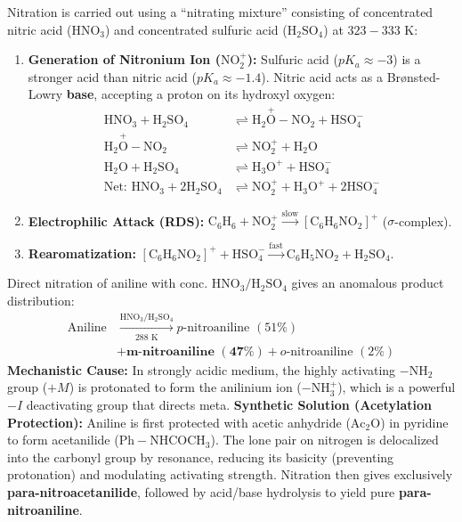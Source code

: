 \documentclass[10pt,twoside,openright]{book}
\begin{document}
\begin{conceptbox}
Nitration is carried out using a ``nitrating mixture'' consisting of concentrated nitric acid ($\mathrm{HNO_3}$) and concentrated sulfuric acid ($\mathrm{H_2SO_4}$) at $323-333\text{ K}$:
\begin{enumerate}[leftmargin=*]
  \item \textbf{Generation of Nitronium Ion ($\mathrm{NO_2^+}$):} Sulfuric acid ($pK_a \approx -3$) is a stronger acid than nitric acid ($pK_a \approx -1.4$). Nitric acid acts as a Br{\o}nsted-Lowry \textbf{base}, accepting a proton on its hydroxyl oxygen:
  \begin{align}
    \mathrm{HNO_3} + \mathrm{H_2SO_4} &\rightleftharpoons \mathrm{H_2\overset{+}{O}-NO_2} + \mathrm{HSO_4^-} \\
    \mathrm{H_2\overset{+}{O}-NO_2} &\rightleftharpoons \mathrm{NO_2^+} + \mathrm{H_2O} \\
    \mathrm{H_2O} + \mathrm{H_2SO_4} &\rightleftharpoons \mathrm{H_3O^+} + \mathrm{HSO_4^-} \\
    \text{Net: } \mathrm{HNO_3} + 2\mathrm{H_2SO_4} &\rightleftharpoons \mathrm{NO_2^+} + \mathrm{H_3O^+} + 2\mathrm{HSO_4^-}
  \end{align}
  \item \textbf{Electrophilic Attack (RDS):} $\mathrm{C_6H_6} + \mathrm{NO_2^+} \xrightarrow{\text{slow}} [\mathrm{C_6H_6NO_2}]^+$ ($\sigma$-complex).
  \item \textbf{Rearomatization:} $[\mathrm{C_6H_6NO_2}]^+ + \mathrm{HSO_4^-} \xrightarrow{\text{fast}} \mathrm{C_6H_5NO_2} + \mathrm{H_2SO_4}$.
\end{enumerate}
\end{conceptbox}

\begin{ncertbox}
Direct nitration of aniline with conc. $\mathrm{HNO_3} / \mathrm{H_2SO_4}$ gives an anomalous product distribution:
\begin{align}
  \text{Aniline} &\xrightarrow[\text{288 K}]{\mathrm{HNO_3/H_2SO_4}} p\text{-nitroaniline } (51\%) \\
  &+ \mathbf{m}\textbf{-nitroaniline } (\mathbf{47\%}) + o\text{-nitroaniline } (2\%)
\end{align}
\textbf{Mechanistic Cause:} In strongly acidic medium, the highly activating $-\mathrm{NH_2}$ group ($+M$) is protonated to form the anilinium ion ($-\mathrm{NH_3^+}$), which is a powerful $-I$ deactivating group that directs meta.
\textbf{Synthetic Solution (Acetylation Protection):} Aniline is first protected with acetic anhydride ($\mathrm{Ac_2O}$) in pyridine to form acetanilide ($\mathrm{Ph-NHCOCH_3}$). The lone pair on nitrogen is delocalized into the carbonyl group by resonance, reducing its basicity (preventing protonation) and modulating activating strength. Nitration then gives exclusively \textbf{para-nitroacetanilide}, followed by acid/base hydrolysis to yield pure \textbf{para-nitroaniline}.
\end{ncertbox}
\end{document}
